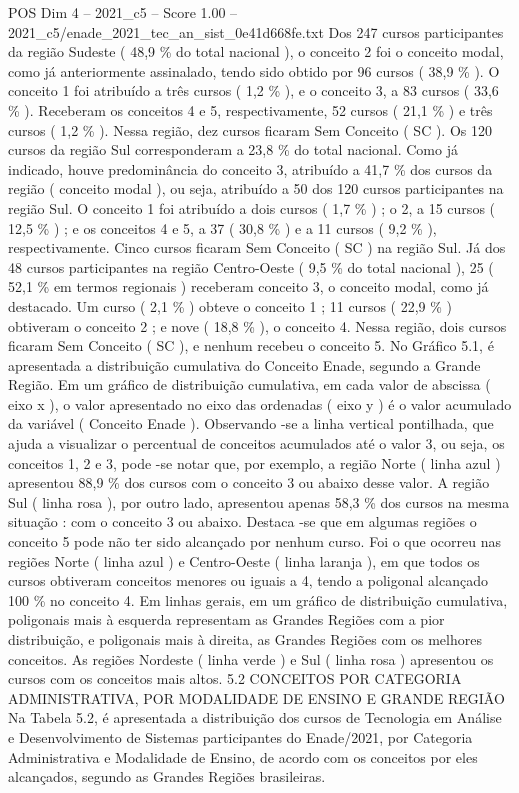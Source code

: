 \begin{textsample}{POS Dim 4 – 2021\_c5 – Score 1.00 – 2021\_c5/enade\_2021\_tec\_an\_sist\_0e41d668fe.txt}
Dos 247 cursos participantes da região Sudeste ( 48,9 \% do total nacional ), o conceito 2 foi o conceito modal, como já anteriormente assinalado, tendo sido obtido por 96 cursos ( 38,9 \% ).
O conceito 1 foi atribuído a três cursos ( 1,2 \% ), e o conceito 3, a 83 cursos ( 33,6 \% ).
Receberam os conceitos 4 e 5, respectivamente, 52 cursos ( 21,1 \% ) e três cursos ( 1,2 \% ).
Nessa região, dez cursos ficaram Sem Conceito ( SC ).
Os 120 cursos da região Sul corresponderam a 23,8 \% do total nacional.
Como já indicado, houve predominância do conceito 3, atribuído a 41,7 \% dos cursos da região ( conceito modal ), ou seja, atribuído a 50 dos 120 cursos participantes na região Sul.
O conceito 1 foi atribuído a dois cursos ( 1,7 \% ) ; o 2, a 15 cursos ( 12,5 \% ) ; e os conceitos 4 e 5, a 37 ( 30,8 \% ) e a 11 cursos ( 9,2 \% ), respectivamente.
Cinco cursos ficaram Sem Conceito ( SC ) na região Sul.
Já dos 48 cursos participantes na região Centro-Oeste ( 9,5 \% do total nacional ), 25 ( 52,1 \% em termos regionais ) receberam conceito 3, o conceito modal, como já destacado.
Um curso ( 2,1 \% ) obteve o conceito 1 ; 11 cursos ( 22,9 \% ) obtiveram o conceito 2 ; e nove ( 18,8 \% ), o conceito 4.
Nessa região, dois cursos ficaram Sem Conceito ( SC ), e nenhum recebeu o conceito 5.
No Gráfico 5.1, é apresentada a distribuição cumulativa do Conceito Enade, segundo a Grande Região.
Em um gráfico de distribuição cumulativa, em cada valor de abscissa ( eixo x ), o valor apresentado no eixo das ordenadas ( eixo y ) é o valor acumulado da variável ( Conceito Enade ).
Observando -se a linha vertical pontilhada, que ajuda a visualizar o percentual de conceitos acumulados até o valor 3, ou seja, os conceitos 1, 2 e 3, pode -se notar que, por exemplo, a região Norte ( linha azul ) apresentou 88,9 \% dos cursos com o conceito 3 ou abaixo desse valor.
A região Sul ( linha rosa ), por outro lado, apresentou apenas 58,3 \% dos cursos na mesma situação : com o conceito 3 ou abaixo.
Destaca -se que em algumas regiões o conceito 5 pode não ter sido alcançado por nenhum curso.
Foi o que ocorreu nas regiões Norte ( linha azul ) e Centro-Oeste ( linha laranja ), em que todos os cursos obtiveram conceitos menores ou iguais a 4, tendo a poligonal alcançado 100 \% no conceito 4.
Em linhas gerais, em um gráfico de distribuição cumulativa, poligonais mais à esquerda representam as Grandes Regiões com a pior distribuição, e poligonais mais à direita, as Grandes Regiões com os melhores conceitos.
As regiões Nordeste ( linha verde ) e Sul ( linha rosa ) apresentou os cursos com os conceitos mais altos. 5.2 CONCEITOS POR CATEGORIA ADMINISTRATIVA, POR MODALIDADE DE ENSINO E GRANDE REGIÃO Na Tabela 5.2, é apresentada a distribuição dos cursos de Tecnologia em Análise e Desenvolvimento de Sistemas participantes do Enade/2021, por Categoria Administrativa e Modalidade de Ensino, de acordo com os conceitos por eles alcançados, segundo as Grandes Regiões brasileiras.

\end{textsample}

